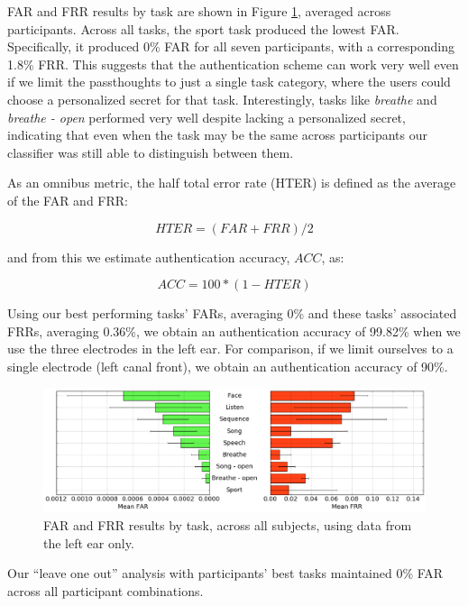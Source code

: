 \documentclass[a4paper,twoside]{article}
\begin{document}
FAR and FRR results by task are shown in Figure \ref{fig:meanByTask}, averaged across participants. Across all tasks, the sport task produced the lowest FAR. Specifically, it produced 0\% FAR for all seven participants, with a corresponding 1.8\% FRR. This suggests that the authentication scheme can work very well even if we limit the passthoughts to just a single task category, where the users could choose a personalized secret for that task. Interestingly, tasks like \textit{breathe} and \textit{breathe - open} performed very well despite lacking a personalized secret, indicating that even when the task may be the same across participants our classifier was still able to distinguish between them.

As an omnibus metric, the half total error rate (HTER) is defined as the average of the FAR and FRR: 

\begin{equation}\label{eq1}
     HTER = (FAR + FRR) / 2
\end{equation}

and from this we estimate authentication accuracy, $ACC$, as:

\begin{equation}\label{eq2}
     ACC = 100 * (1 - HTER)
\end{equation}

Using our best performing tasks' FARs, averaging 0\% and these tasks' associated FRRs, averaging 0.36\%, we obtain an authentication accuracy of 99.82\% when we use the three electrodes in the left ear. For comparison, if we limit ourselves to a single electrode (left canal front), we obtain an authentication accuracy of 90\%.

\begin{figure}[t]
\centering
\includegraphics[width=.9\linewidth]{./figures/mean-far-and-frr-by-task.png}
\caption{FAR and FRR results by task, across all subjects, using data from the left ear only.}
\label{fig:meanByTask}
\end{figure}

Our ``leave one out'' analysis with participants' best tasks maintained 0\% FAR across all participant combinations. 
\end{document}
